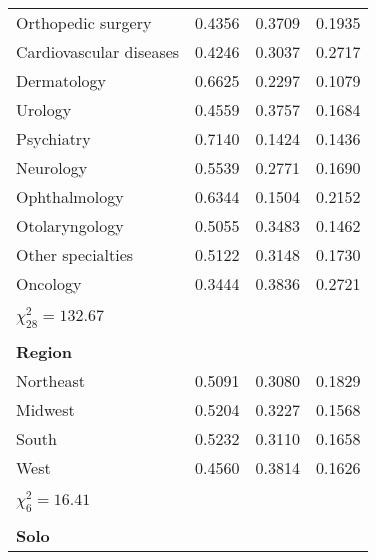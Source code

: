\documentclass[11pt, oneside]{article}        %
\begin{document}
{\begin{center}
\begin{longtable}{lccc}
Orthopedic surgery                     & 0.4356   & 0.3709     & 0.1935     \\
Cardiovascular diseases                & 0.4246   & 0.3037     & 0.2717     \\
Dermatology                            & 0.6625   & 0.2297     & 0.1079     \\
Urology                                & 0.4559   & 0.3757     & 0.1684     \\
Psychiatry                             & 0.7140   & 0.1424     & 0.1436     \\
Neurology                              & 0.5539   & 0.2771     & 0.1690     \\
Ophthalmology                          & 0.6344   & 0.1504     & 0.2152     \\
Otolaryngology                         & 0.5055   & 0.3483     & 0.1462     \\
Other specialties                      & 0.5122   & 0.3148     & 0.1730     \\
Oncology                               & 0.3444   & 0.3836     & 0.2721     \\
                                       &          &            &            \\
$\chi^2_{28} = 132.67$                 &          &            &            \\
                                       &          &            &            \\
\textbf{Region}                        &          &            &            \\
Northeast                              & 0.5091   & 0.3080     & 0.1829     \\
Midwest                                & 0.5204   & 0.3227     & 0.1568     \\
South                                  & 0.5232   & 0.3110     & 0.1658     \\
West                                   & 0.4560   & 0.3814     & 0.1626     \\
                                       &          &            &            \\
$\chi^2_6 = 16.41$                     &          &            &            \\
                                       &          &            &            \\
\textbf{Solo}                          &          &            &            \\

\end{longtable}
\end{center}}
\end{document}
